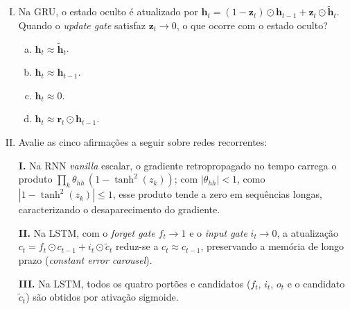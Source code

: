 \documentclass{dlproblemset}
\begin{document}
\begin{enumerate}[I)]
\begin{enumerate}[a)]
    \item $\approx 0.3000$.
    \item $\approx 0.2913$.
    \item $\approx 0.4621$.
    \item $\approx 0.2773$.
\end{enumerate}

\item Na GRU, o estado oculto é atualizado por
$\mathbf{h}_t = (1 - \mathbf{z}_t) \odot \mathbf{h}_{t-1} + \mathbf{z}_t \odot \tilde{\mathbf{h}}_t$. Quando o \textit{update gate}
satisfaz $\mathbf{z}_t \to 0$, o que ocorre com o estado oculto?

\begin{enumerate}[a)]
    \item $\mathbf{h}_t \approx \tilde{\mathbf{h}}_t$.
    \item $\mathbf{h}_t \approx \mathbf{h}_{t-1}$.
    \item $\mathbf{h}_t \approx 0$.
    \item $\mathbf{h}_t \approx \mathbf{r}_t \odot \mathbf{h}_{t-1}$.
\end{enumerate}

\item Avalie as cinco afirmações a seguir sobre redes recorrentes:

\textbf{I.} Na RNN \textit{vanilla} escalar, o gradiente retropropagado no tempo carrega o produto $\prod_k \theta_{hh}\,(1 - \tanh^2(z_k))$; com $|\theta_{hh}| < 1$, como $|1 - \tanh^2(z_k)| \le 1$, esse produto tende a zero em sequências longas, caracterizando o desaparecimento do gradiente.

\textbf{II.} Na LSTM, com o \textit{forget gate} $f_t \to 1$ e o \textit{input gate} $i_t \to 0$, a atualização $c_t = f_t \odot c_{t-1} + i_t \odot \tilde{c}_t$ reduz-se a $c_t \approx c_{t-1}$, preservando a memória de longo prazo (\textit{constant error carousel}).

\textbf{III.} Na LSTM, todos os quatro portões e candidatos ($f_t$, $i_t$, $o_t$ e o candidato $\tilde{c}_t$) são obtidos por ativação sigmoide.


\end{enumerate}
\end{document}
